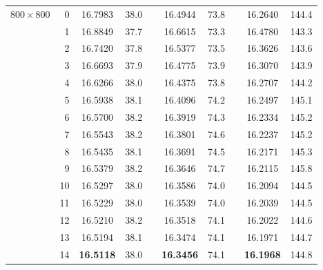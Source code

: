 \begin{table}[p!]
{\begin{tabular}{crcrlcrlcr}
\hline
$800\times 800$ &  0 &      16.7983  & 38.0 &  &      16.4944  & 73.8 &  &      16.2640  & 144.4 \\
                &  1 &      16.8849  & 37.7 &  &      16.6615  & 73.3 &  &      16.4780  & 143.3 \\
                &  2 &      16.7420  & 37.8 &  &      16.5377  & 73.5 &  &      16.3626  & 143.6 \\
                &  3 &      16.6693  & 37.9 &  &      16.4775  & 73.9 &  &      16.3070  & 143.9 \\
                &  4 &      16.6266  & 38.0 &  &      16.4375  & 73.8 &  &      16.2707  & 144.2 \\
                &  5 &      16.5938  & 38.1 &  &      16.4096  & 74.2 &  &      16.2497  & 145.1 \\
                &  6 &      16.5700  & 38.2 &  &      16.3919  & 74.3 &  &      16.2334  & 145.2 \\
                &  7 &      16.5543  & 38.2 &  &      16.3801  & 74.6 &  &      16.2237  & 145.2 \\
                &  8 &      16.5435  & 38.1 &  &      16.3691  & 74.5 &  &      16.2171  & 145.3 \\
                &  9 &      16.5379  & 38.2 &  &      16.3646  & 74.7 &  &      16.2115  & 145.8 \\
                & 10 &      16.5297  & 38.0 &  &      16.3586  & 74.0 &  &      16.2094  & 144.5 \\
                & 11 &      16.5229  & 38.0 &  &      16.3539  & 74.0 &  &      16.2039  & 144.5 \\
                & 12 &      16.5210  & 38.2 &  &      16.3518  & 74.1 &  &      16.2022  & 144.6 \\
                & 13 &      16.5194  & 38.1 &  &      16.3474  & 74.1 &  &      16.1971  & 144.7 \\
                & 14 & {\bf 16.5118} & 38.0 &  & {\bf 16.3456} & 74.1 &  & {\bf 16.1968} & 144.8 \\
\hline
\end{tabular}}
\end{table}

